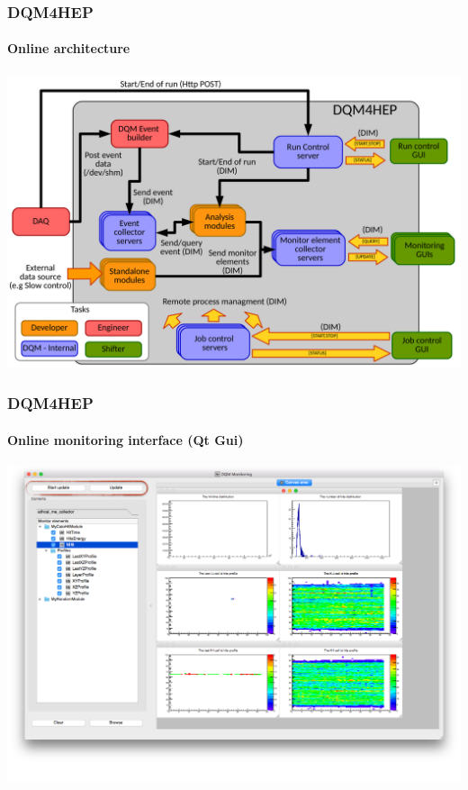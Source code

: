 \documentclass[presentation, 10pt]{beamer}
\begin{document}
\begin{frame}
  \frametitle{DQM4HEP}
  \framesubtitle{Online architecture}
  \centering\includegraphics[width=0.9\linewidth]{figs/GlobalArchitectureDiagram.pdf}
\end{frame}

\begin{frame}
  \frametitle{DQM4HEP}
  \framesubtitle{Online monitoring interface (Qt Gui)}
    \centering\includegraphics[width=0.95\linewidth]{figs/DQM4HEPMonitoringGui.png}
\end{frame}
\end{document}
